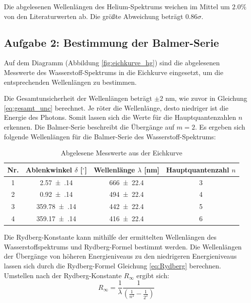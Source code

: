 \documentclass[12pt,a4paper,titlepage]{scrartcl}
\numberwithin{equation}{section}
\numberwithin{table}{section}
\numberwithin{figure}{section}
\begin{document}
\begin{resultbox}[Ergebnis]
    Die abgelesenen Wellenlängen des Helium-Spektrums weichen im Mittel um $2.0\%$ von den Literaturwerten ab. Die größte Abweichung beträgt $0.86\sigma$.
\end{resultbox}

\subsection{Aufgabe 2: Bestimmung der Balmer-Serie}

Auf dem Diagramm (Abbildung \ref{fig:eichkurve_hg}) sind die abgelesenen Messwerte des Wasserstoff-Spektrums in die Eichkurve eingesetzt, um die entsprechenden Wellenlängen zu bestimmen. 

Die Gesamtunsicherheit der Wellenlängen beträgt $\pm 2$ nm, wie zuvor in Gleichung \ref{eq:gesamt_unc} berechnet. Je röter die Wellenlänge, desto niedriger ist die Energie des Photons. Somit lassen sich die Werte für die Hauptquantenzahlen $n$ erkennen. Die Balmer-Serie beschreibt die Übergänge auf $ m = 2$. 
Es ergeben sich folgende Wellenlängen für die Balmer-Serie des Wasserstoff-Spektrums:
\begin{table}[H]
    \centering
    \caption{Abgelesene Messwerte aus der Eichkurve}\label{H-tabelle}
    \begin{tabular}{c c c c}
        \toprule
        \textbf{Nr.} & {\textbf{Ablenkwinkel $\delta$ [$^{\circ}$]}} & {\textbf{Wellenlänge $\lambda$ [nm]}} & \textbf{Hauptquantenzahl $n$} \\
        \midrule
        1 & \num{2.57(14)} & \num{666(22.4)} & 3 \\
        2 & \num{0.92(14)} & \num{494(22.4)} & 4 \\
        3 & \num{359.78(14)} & \num{442(22.4)} & 5 \\
        4 & \num{359.17(14)} & \num{416(22.4)} & 6 \\
        \bottomrule
    \end{tabular}
\end{table}

Die Rydberg-Konstante kann mithilfe der ermittelten Wellenlängen des Wasserstoffspektrums  und Rydberg-Formel bestimmt werden. Die Wellenlängen der Übergänge von höheren Energieniveaus zu den niedrigeren Energieniveaus lassen sich durch die Rydberg-Formel Gleichung \ref{eq:Rydberg} berechnen. 
Umstellen nach der Rydberg-Konstante $R_\infty$ ergibt sich:
\begin{equation}
    R_\infty = \frac{1}{\lambda} \frac{1}{\left( \frac{1}{n^2} - \frac{1}{2^2} \right)}
\end{equation}
\end{document}
